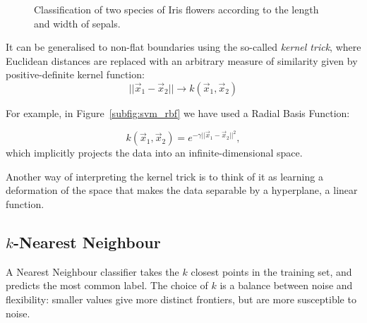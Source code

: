 \begin{figure}
\centering
{}%
\hfill
{}%
\caption{Classification of two species of Iris flowers according to the length and width of sepals.}\label{fig:svm}
\end{figure}

It can be generalised  to non-flat boundaries using the so-called \emph{kernel trick}, where Euclidean distances are replaced with an arbitrary measure of similarity given by positive-definite kernel function:
\[||\vec{x}_1 - \vec{x}_2|| \rightarrow k(\vec{x}_1, \vec{x}_2)\]

For example, in Figure~\ref{subfig:svm_rbf} we have used a Radial Basis Function:

\[k(\vec{x}_1, \vec{x}_2) = e^{-\gamma ||\vec{x}_1 - \vec{x}_2||^2 },\]
which implicitly projects the data into an infinite-dimensional space.

Another way of interpreting the kernel trick is to think of it as learning a deformation of the space that makes the data separable by a hyperplane, a linear function.

\subsection{$k$-Nearest Neighbour}
A Nearest Neighbour classifier takes the $k$ closest points in the training set, and predicts the most common label.
The choice of $k$ is a balance between noise and flexibility: smaller values give more distinct frontiers, but are more susceptible to noise.

